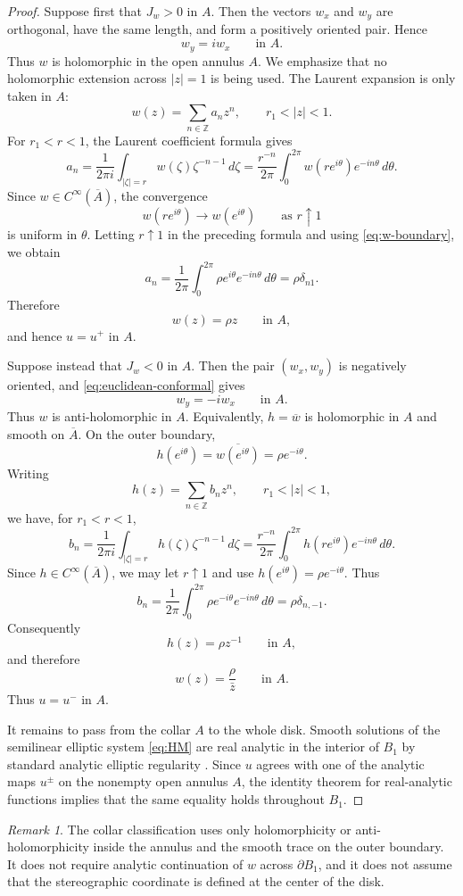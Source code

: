 \documentclass[11pt]{amsart}
\numberwithin{equation}{section}
\theoremstyle{remark}
\newtheorem*{remark}{Remark}
\begin{document}
\begin{proof}
Suppose first that $J_w>0$ in $A$. Then the vectors $w_x$ and $w_y$ are orthogonal, have the same length, and form a positively oriented pair.
Hence
\[
w_y=iw_x
\qquad\text{in }A.
\]
Thus $w$ is holomorphic in the open annulus $A$. We emphasize that no holomorphic extension across $|z|=1$ is being used. The Laurent
expansion is only taken in $A$:
\[
w(z)=\sum_{n\in\mathbb Z}a_nz^n,
\qquad r_1<|z|<1.
\]
For $r_1<r<1$, the Laurent coefficient formula gives
\[
a_n=\frac{1}{2\pi i}\int_{|\zeta|=r}w(\zeta)\zeta^{-n-1}\,d\zeta
=\frac{r^{-n}}{2\pi}\int_0^{2\pi}w(re^{i\theta})e^{-in\theta}\,d\theta.
\]
Since $w\in C^\infty(\overline A)$, the convergence
\[
w(re^{i\theta})\longrightarrow w(e^{i\theta})
\qquad\text{as }r\uparrow1
\]
is uniform in $\theta$. Letting $r\uparrow1$ in the preceding formula and using \eqref{eq:w-boundary}, we obtain
\[
a_n=\frac1{2\pi}\int_0^{2\pi}\rho e^{i\theta}e^{-in\theta}\,d\theta
=\rho\delta_{n1}.
\]
Therefore
\[
w(z)=\rho z
\qquad\text{in }A,
\]
and hence $u=u^+$ in $A$.

Suppose instead that $J_w<0$ in $A$. Then the pair $(w_x,w_y)$ is negatively oriented, and \eqref{eq:euclidean-conformal} gives
\[
w_y=-iw_x
\qquad\text{in }A.
\]
Thus $w$ is anti-holomorphic in $A$. Equivalently, $h=\overline w$ is holomorphic in $A$ and smooth on $\overline A$. On the outer boundary,
\[
h(e^{i\theta})=\overline{w(e^{i\theta})}=\rho e^{-i\theta}.
\]
Writing
\[
h(z)=\sum_{n\in\mathbb Z}b_nz^n,
\qquad r_1<|z|<1,
\]
we have, for $r_1<r<1$,
\[
b_n=\frac{1}{2\pi i}\int_{|\zeta|=r}h(\zeta)\zeta^{-n-1}\,d\zeta
=\frac{r^{-n}}{2\pi}\int_0^{2\pi}h(re^{i\theta})e^{-in\theta}\,d\theta.
\]
Since $h\in C^\infty(\overline A)$, we may let $r\uparrow1$ and use $h(e^{i\theta})=\rho e^{-i\theta}$. Thus
\[
b_n=\frac1{2\pi}\int_0^{2\pi}\rho e^{-i\theta}e^{-in\theta}\,d\theta
=\rho\delta_{n,-1}.
\]
Consequently
\[
h(z)=\rho z^{-1}
\qquad\text{in }A,
\]
and therefore
\[
w(z)=\frac\rho{\bar z}
\qquad\text{in }A.
\]
Thus $u=u^-$ in $A$.



It remains to pass from the collar $A$ to the whole disk. Smooth solutions of the semilinear elliptic system \eqref{eq:HM} are real analytic
in the interior of $B_1$ by standard analytic elliptic regularity \cite{Morrey1958}. Since $u$ agrees with one of the analytic maps $u^\pm$ on
the nonempty open annulus $A$, the identity theorem for real-analytic functions implies that the same equality holds throughout $B_1$.
\end{proof}

\begin{remark}
The collar classification uses only holomorphicity or anti-holomorphicity inside the annulus and the smooth trace on the outer boundary. It
does not require analytic continuation of $w$ across $\partial B_1$, and it does not assume that the stereographic coordinate is defined at
the center of the disk.
\end{remark}
\end{document}
